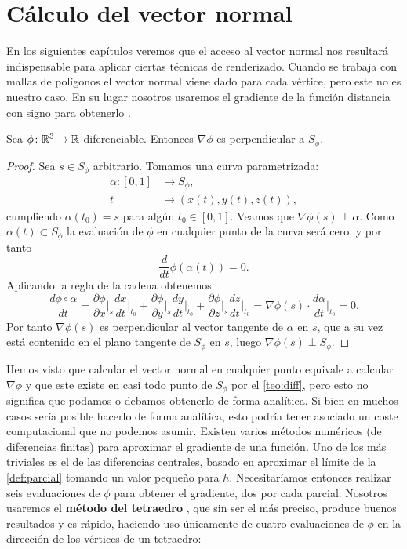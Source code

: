 \section{Cálculo del vector normal}
En los siguientes capítulos veremos que el acceso al vector normal nos resultará indispensable para aplicar ciertas técnicas de renderizado. Cuando se trabaja con mallas de polígonos el vector normal viene dado para cada vértice, pero este no es nuestro caso. En su lugar nosotros usaremos el gradiente de la función distancia con signo para obtenerlo \cite{harvard}.
\begin{proposicion}\label{p:gradient_perp}
  Sea $\phi\colon \mathbb{R}^3\to \mathbb{R}$ diferenciable. Entonces $\nabla\phi$ es perpendicular a $S_\phi$.
\end{proposicion}
\begin{proof}
  Sea $s\in S_\phi$ arbitrario. Tomamos una curva parametrizada:
  \begin{align*}
    \alpha \colon [0,1] & \to S_\phi,\\
    t                   & \mapsto \left(x(t), y(t), z(t) \right),
  \end{align*}
  cumpliendo $\alpha(t_0)=s$ para algún $t_0\in [0,1]$. Veamos que $\nabla\phi(s) \perp \alpha$. Como $ \alpha(t)\subset S_\phi$ la evaluación de $\phi$ en cualquier punto de la curva será cero, y por tanto
  \begin{equation*}
      \frac{d}{dt}\phi(\alpha(t)) = 0.
  \end{equation*}
  Aplicando la regla de la cadena obtenemos
  \begin{equation*}
       \frac{d\phi \circ \alpha}{dt} = \frac{\partial{\phi}}{\partial{x}}\bigg\rvert_s \frac{dx}{dt}\bigg\rvert_{t_0} + \frac{\partial{\phi}}{\partial{y}}\bigg\rvert_s\frac{dy}{dt}\bigg\rvert_{t_0} + \frac{\partial{\phi}}{\partial{z}}\bigg\rvert_s\frac{dz}{dt}\bigg\rvert_{t_0} = \nabla \phi (s) \cdot \frac{d\alpha}{dt}\bigg\rvert_{t_0} = 0.
  \end{equation*}
    Por tanto $\nabla\phi(s)$ es perpendicular al vector tangente de $\alpha$ en $s$, que a su vez está contenido en el plano tangente de $S_\phi$ en $s$, luego $\nabla\phi(s) \perp S_\phi$.
\end{proof}

Hemos visto que calcular el vector normal en cualquier punto equivale a calcular $\nabla\phi$ y que este existe en casi todo punto de $S_{\phi}$ por el \autoref{teo:diff}, pero esto no significa que podamos o debamos obtenerlo de forma analítica. Si bien en muchos casos sería posible hacerlo de forma analítica, esto podría tener asociado un coste computacional que no podemos asumir. Existen varios métodos numéricos (de diferencias finitas) para aproximar el gradiente de una función. Uno de los más triviales es el de las diferencias centrales, basado en aproximar el límite de la \autoref{def:parcial} tomando un valor pequeño para $h$. Necesitaríamos entonces realizar seis evaluaciones de $\phi$ para obtener el gradiente, dos por cada parcial. Nosotros usaremos el \textbf{método del tetraedro} \cite{article:tetra}, que sin ser el más preciso,  produce buenos resultados y es rápido, haciendo uso únicamente de cuatro evaluaciones de $\phi$ en la dirección de los vértices de un tetraedro:


